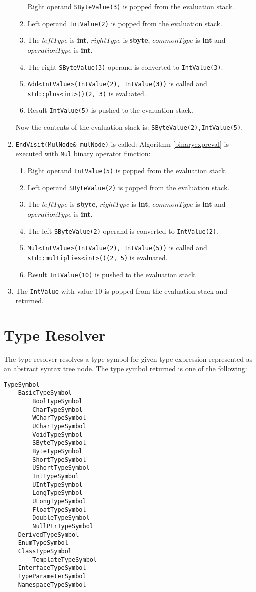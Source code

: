 \documentclass[a4paper,oneside,11pt]{book}
\theoremstyle{definition}
\begin{document}
\begin{enumerate}
\begin{enumerate}
Right operand \verb|SByteValue(3)| is popped from the evaluation stack.
\item
Left operand \verb|IntValue(2)| is popped from the evaluation stack.
\item
The $leftType$ is \textbf{int}, $rightType$ is \textbf{sbyte}, $commonType$ is \textbf{int} and $operationType$ is \textbf{int}.
\item
The right \verb|SByteValue(3)| operand is converted to \verb|IntValue(3)|.
\item
\verb|Add<IntValue>(IntValue(2), IntValue(3))| is called and \verb|std::plus<int>()(2, 3)| is evaluated.
\item
Result \verb|IntValue(5)| is pushed to the evaluation stack.
\end{enumerate}
Now the contents of the evaluation stack is: \verb|SByteValue(2),IntValue(5)|.
\item
\verb|EndVisit(MulNode& mulNode)| is called:
Algorithm \ref{binaryexpreval} is executed with \verb|Mul| binary operator function:
\begin{enumerate}
\item
Right operand \verb|IntValue(5)| is popped from the evaluation stack.
\item
Left operand \verb|SByteValue(2)| is popped from the evaluation stack.
\item
The $leftType$ is \textbf{sbyte}, $rightType$ is \textbf{int}, $commonType$ is \textbf{int} and $operationType$ is \textbf{int}.
\item
The left \verb|SByteValue(2)| operand is converted to \verb|IntValue(2)|.
\item
\verb|Mul<IntValue>(IntValue(2), IntValue(5))| is called and \verb|std::multiplies<int>()(2, 5)| is evaluated.
\item
Result \verb|IntValue(10)| is pushed to the evaluation stack.
\end{enumerate}
\item
The \verb|IntValue| with value 10 is popped from the evaluation stack and returned.
\end{enumerate}

\chapter{Type Resolver}\label{typeresolver}

The type resolver resolves a type symbol for given type expression represented as an abstract syntax tree node.
The type symbol returned is one of the following:
\begin{verbatim}
TypeSymbol
    BasicTypeSymbol
        BoolTypeSymbol
        CharTypeSymbol
        WCharTypeSymbol
        UCharTypeSymbol
        VoidTypeSymbol
        SByteTypeSymbol
        ByteTypeSymbol
        ShortTypeSymbol
        UShortTypeSymbol
        IntTypeSymbol
        UIntTypeSymbol
        LongTypeSymbol
        ULongTypeSymbol
        FloatTypeSymbol
        DoubleTypeSymbol
        NullPtrTypeSymbol
    DerivedTypeSymbol
    EnumTypeSymbol
    ClassTypeSymbol
        TemplateTypeSymbol
    InterfaceTypeSymbol
    TypeParameterSymbol
    NamespaceTypeSymbol
\end{verbatim}
\end{document}
